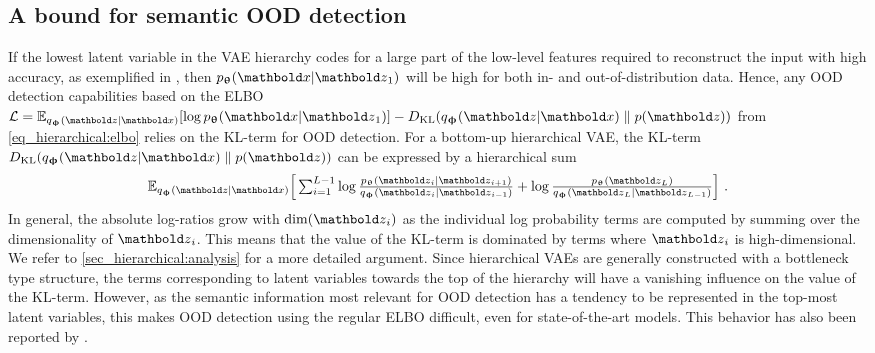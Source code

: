 {\subsection{A bound for semantic OOD detection}
If the lowest latent variable in the VAE hierarchy codes for a large part of the low-level features required to reconstruct the input with high accuracy, as exemplified in , then $p_\thetab(\xb|\zb_1)$ will be high for both in- and out-of-distribution data.
Hence, any OOD detection capabilities based on the ELBO $\mathcal{L} = \mathbb{E}_{q_\phib(\zb|\xb)}[\log p_\thetab(\xb|\zb_1)] - D_{\mathrm{KL}}( q_\phib(\zb|\xb) \parallel  p(\zb))$ from \cref{eq_hierarchical:elbo} relies on the KL-term for OOD detection. For a bottom-up hierarchical VAE, the KL-term $D_{\mathrm{KL}}( q_\phib(\zb|\xb) \parallel  p(\zb))$ can be expressed by a hierarchical sum%
\begin{equation}
    \mathbb{E}_{q_\phib(\zb|\xb)} \Big[ \textstyle\sum_{i=1}^{L-1} \log \frac{p_\thetab(\zb_i|\zb_{i+1})}{q_\phib(\zb_i|\zb_{i-1})} + \log \frac{p_\thetab(\zb_L)}{q_\phib(\zb_L|\zb_{L-1})} \Big] \ .
\end{equation}
In general, the absolute log-ratios grow with $\mathrm{dim}(\zb_i)$ as the individual log probability terms are computed by summing over the dimensionality of $\zb_i$.
This means that the value of the KL-term is dominated by terms where $\zb_i$ is high-dimensional. We refer to \cref{sec_hierarchical:analysis} for a more detailed argument.
Since hierarchical VAEs are generally constructed with a bottleneck type structure, the terms corresponding to latent variables towards the top of the hierarchy will have a vanishing influence on the value of the KL-term.
However, as the semantic information most relevant for OOD detection has a tendency to be represented in the top-most latent variables, this makes OOD detection using the regular ELBO difficult, even for state-of-the-art models.
This behavior has also been reported by \textcite{xiao_likelihood_2020}.

}

